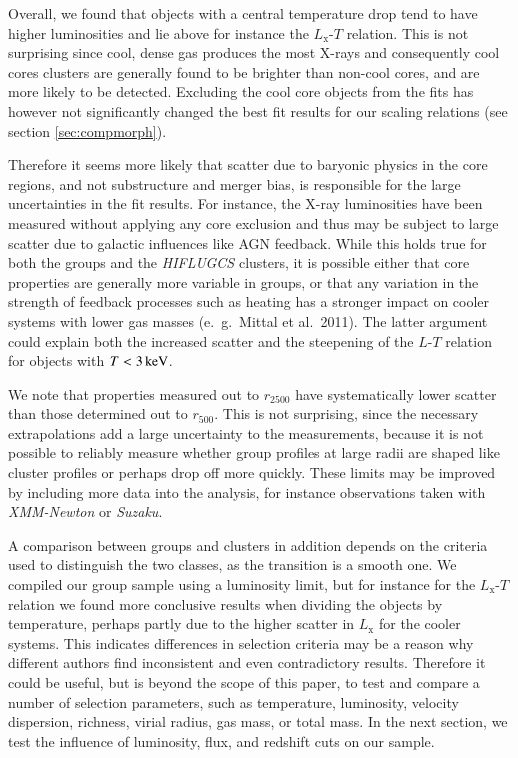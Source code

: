 \documentclass[structabstract]{aa}
\begin{document}
  Overall, we found that objects with a central temperature drop tend
  to have higher luminosities and lie above for instance the
  $L_{\text{x}}$-$T$ relation. This is not surprising since cool,
  dense gas produces the most X-rays and consequently cool cores
  clusters are generally found to be brighter than non-cool cores, and are
  more likely to be detected. Excluding the cool core objects from the
  fits has however not significantly changed the best fit results for
  our scaling relations (see section \ref{sec:compmorph}).

  Therefore it seems more likely that scatter due to baryonic physics
  in the core regions, and not substructure and merger bias, is
  responsible for the large uncertainties in the fit results. For
  instance, the X-ray luminosities have been measured without applying
  any core exclusion and thus may be subject to large scatter due to
  galactic influences like AGN feedback. While this holds true for
  both the groups and the \emph{HIFLUGCS} clusters, it is possible
  either that core properties are generally more variable in groups,
  or that any variation in the strength of feedback processes such as
  heating has a stronger impact on cooler systems with lower gas
  masses (e.\ g.\ Mittal et al.\ 2011). The latter argument could
  explain both the increased scatter and the steepening of the
  $L$-$T$ relation for objects with $T<\unit[3]{keV}$.

We note that properties measured out to $r_{2500}$ have systematically
lower scatter than those determined out to $r_{500}$. This is not
surprising, since the necessary extrapolations add a large uncertainty
to the measurements, because it is not possible to reliably measure
whether group profiles at large radii are shaped like cluster profiles
or perhaps drop off more quickly. These limits may be improved by
including more data into the analysis, for instance observations taken
with \emph{XMM-Newton} or \emph{Suzaku}.

A comparison between groups and clusters in addition depends on the
criteria used to distinguish the two classes, as the transition is a
smooth one. We compiled our group sample using a luminosity limit, but
for instance for the $L_{\text{x}}$-$T$ relation we found more
conclusive results when dividing the objects by temperature, perhaps
partly due to the higher scatter in $L_{\text{x}}$ for the cooler
systems. This indicates differences in selection criteria may be a
reason why different authors find inconsistent and even contradictory
results. Therefore it could be useful, but is beyond the scope of this
paper, to test and compare a number of selection parameters, such as
temperature, luminosity, velocity dispersion, richness, virial radius,
gas mass, or total mass. In the next section, we test the
  influence of luminosity, flux, and redshift cuts on our sample.
%
\end{document}
